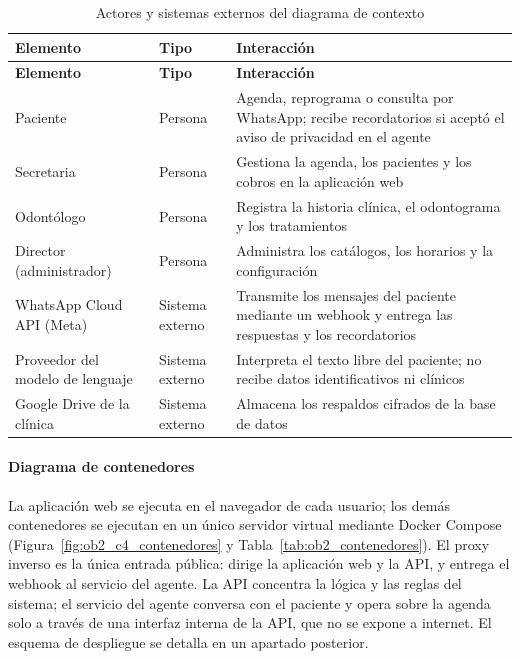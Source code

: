 \begingroup
\fontsize{9}{11}\selectfont
\renewcommand{\arraystretch}{1.2}
\setlength{\LTpre}{0pt}\setlength{\LTpost}{6pt}
\setlength{\tabcolsep}{4pt}
\begin{xltabular}{\linewidth}{|>{\raggedright\arraybackslash}p{3.6cm}|>{\raggedright\arraybackslash}p{2.8cm}|>{\raggedright\arraybackslash}X|}
\caption{Actores y sistemas externos del diagrama de contexto}
\label{tab:ob2_contexto} \\
\hline
\textbf{Elemento} & \textbf{Tipo} & \textbf{Interacción} \\ \hline
\endfirsthead
\hline
\textbf{Elemento} & \textbf{Tipo} & \textbf{Interacción} \\ \hline
\endhead
Paciente & Persona & Agenda, reprograma o consulta por WhatsApp; recibe recordatorios si aceptó el aviso de privacidad en el agente \\ \hline
Secretaria & Persona & Gestiona la agenda, los pacientes y los cobros en la aplicación web \\ \hline
Odontólogo & Persona & Registra la historia clínica, el odontograma y los tratamientos \\ \hline
Director (administrador) & Persona & Administra los catálogos, los horarios y la configuración \\ \hline
WhatsApp Cloud API (Meta) & Sistema externo & Transmite los mensajes del paciente mediante un webhook y entrega las respuestas y los recordatorios \\ \hline
Proveedor del modelo de lenguaje & Sistema externo & Interpreta el texto libre del paciente; no recibe datos identificativos ni clínicos \\ \hline
Google Drive de la clínica & Sistema externo & Almacena los respaldos cifrados de la base de datos \\ \hline
\end{xltabular}
\endgroup

\paragraph{Diagrama de contenedores}

La aplicación web se ejecuta en el navegador de cada usuario; los demás contenedores se ejecutan en un único servidor virtual mediante Docker Compose (Figura~\ref{fig:ob2_c4_contenedores} y Tabla~\ref{tab:ob2_contenedores}). El proxy inverso es la única entrada pública: dirige la aplicación web y la API, y entrega el webhook al servicio del agente. La API concentra la lógica y las reglas del sistema; el servicio del agente conversa con el paciente y opera sobre la agenda solo a través de una interfaz interna de la API, que no se expone a internet. El esquema de despliegue se detalla en un apartado posterior.


